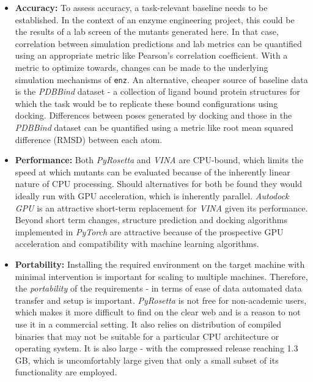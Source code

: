 \documentclass[16pt]{book}
\begin{document}
\begin{itemize}
	\item \textbf{Accuracy:} To assess accuracy, a task-relevant baseline needs to be established. 
		In the context of an enzyme engineering project, this could be the results of a lab screen of the mutants generated here.
		In that case, correlation between simulation predictions and lab metrics can be quantified using an appropriate metric like Pearson's correlation coefficient. 
		With a metric to optimize towards, changes can be made to the underlying simulation mechanisms of \texttt{enz}.
		An alternative, cheaper source of baseline data is the \textit{PDBBind}\cite{liu2015pdb} dataset - a collection of ligand bound protein structures for which the task would be to replicate these bound configurations using docking.
		Differences between poses generated by docking and those in the \textit{PDBBind} dataset can be quantified using a metric like root mean squared difference (RMSD) between each atom.
		
	\item \textbf{Performance:} Both \textit{PyRosetta} and \textit{VINA} are CPU-bound, which limits the speed at which mutants can be evaluated because of the inherently linear nature of CPU processing. 
		Should alternatives for both be found they would ideally run with GPU acceleration, which is inherently parallel.
		\textit{Autodock GPU}\cite{santos2021accelerating} is an attractive short-term replacement for \textit{VINA} given its performance. 
		Beyond short term changes, structure prediction and docking algorithms implemented in \textit{PyTorch} are attractive because of the prospective GPU acceleration and compatibility with machine learning algorithms.
	\item \textbf{Portability:} Installing the required environment on the target machine with minimal intervention is important for scaling to multiple machines.
		Therefore, the \textit{portability} of the requirements - in terms of ease of data automated data transfer and setup is important.
		\textit{PyRosetta} is not free for non-academic users, which makes it more difficult to find on the clear web and is a reason to not use it in a commercial setting.
		It also relies on distribution of compiled binaries that may not be suitable for a particular CPU architecture or operating system.
		It is also large - with the compressed release reaching 1.3 GB, which is uncomfortably large given that only a small subset of its functionality are employed.
\end{itemize}
\end{document}
